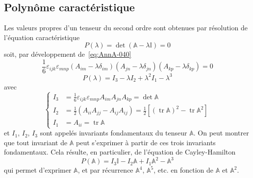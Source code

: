 \subsection{Polynôme caractéristique}
Les valeurs propres d'un tenseur du second ordre sont obtenues par résolution de l'équation caractéristique
\begin{equation}
    P\left( \lambda \right) = \det \left( \mathbb{A} - \lambda \mathbb{I} \right) = 0
    \label{eq:AnnA-042}
\end{equation}
soit, par développement de~\eqref{eq:AnnA-040}
\begin{displaymath}
    \frac{1}{6} \varepsilon_{ijk} \varepsilon_{mnp} \left( A_{im} -\lambda \delta_{im} \right) \left( A_{jn} - \lambda \delta_{jn} \right) \left( A_{kp} - \lambda \delta_{kp} \right) = 0
\end{displaymath}
\begin{equation}
    P\left( \lambda \right) = I_3 -\lambda I_2 + \lambda^{2} I_1 - \lambda^3
    \label{eq:AnnA-043}
\end{equation}
avec
\begin{equation}
    \left\{
    \begin{aligned}
        I_3 &= \frac{1}{6} \varepsilon_{ijk} \varepsilon_{mnp} A_{im} A_{jn} A_{kp} = \det \mathbb{A} \\
        I_2 &= \frac{1}{2} \left( A_{ii} A_{jj} - A_{ij} A_{ij} \right) = \frac{1}{2} \left[ \left( \operatorname{tr} \mathbb{A} \right)^2 - \operatorname{tr} \mathbb{A}^2 \right] \\
        I_1 &= A_{ii} = \operatorname{tr} \mathbb{A}
    \end{aligned}
    \right.
    \label{eq:AnnA-044}
\end{equation}
et $I_1$, $I_2$, $I_3$ sont appelés invariants fondamentaux du tenseur $\mathbb{A}$.
On peut montrer que tout invariant de $\mathbb{A}$ peut s'exprimer à partir de ces trois invariants fondamentaux.
Cela résulte, en particulier, de l'équation de Cayley-Hamilton
\begin{equation}
    P\left( \mathbb{A} \right) = I_3 \mathbb{I} - I_2 \mathbb{A} + I_1 \mathbb{A}^2 - \mathbb{A}^3
    \label{eq:AnnA-045}
\end{equation}
qui permet d'exprimer $\mathbb{A}$, et par récurrence $\mathbb{A}^4$, $\mathbb{A}^5$, etc. en fonction de $\mathbb{A}$ et $\mathbb{A}^2$.
